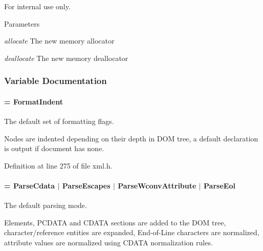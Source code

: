 \begin{DoxyInternal}{For internal use only.}

\begin{DoxyParams}{Parameters}
\item[{\em allocate}]The new memory allocator \item[{\em deallocate}]The new memory deallocator \end{DoxyParams}
\end{DoxyInternal}


\subsubsection{Variable Documentation}
\hypertarget{namespacephys_1_1xml_a08bf6aab51f79929d9097706a5e64408}{
\paragraph[{FormatDefault}]{ = {\bf FormatIndent}}\hfill}
\label{d9/d27/namespacephys_1_1xml_a08bf6aab51f79929d9097706a5e64408}


The default set of formatting flags. 

Nodes are indented depending on their depth in DOM tree, a default declaration is output if document has none. 

Definition at line 275 of file xml.h.

\hypertarget{namespacephys_1_1xml_aa6b8f7f8c2322fd683a235b498834d60}{
\paragraph[{ParseDefault}]{ = {\bf ParseCdata} $|$ {\bf ParseEscapes} $|$ {\bf ParseWconvAttribute} $|$ {\bf ParseEol}}\hfill}
\label{d9/d27/namespacephys_1_1xml_aa6b8f7f8c2322fd683a235b498834d60}


The default parsing mode. 

Elements, PCDATA and CDATA sections are added to the DOM tree, character/reference entities are expanded, End-\/of-\/Line characters are normalized, attribute values are normalized using CDATA normalization rules. 

